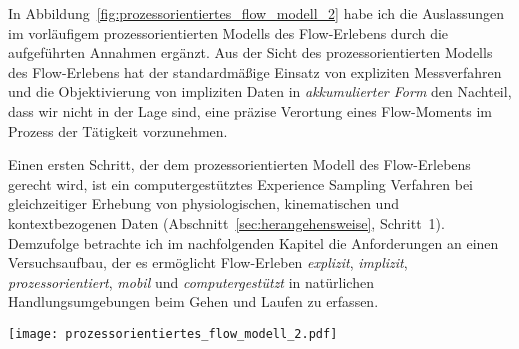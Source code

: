 In Abbildung~\ref{fig:prozessorientiertes_flow_modell_2} habe ich die Auslassungen im vorläufigem prozessorientierten Modells des Flow-Erlebens durch die aufgeführten Annahmen ergänzt. Aus der Sicht des prozessorientierten Modells des Flow-Erlebens hat der standardmäßige Einsatz von expliziten Messverfahren und die Objektivierung von impliziten Daten in \emph{akkumulierter Form} den Nachteil, dass wir nicht in der Lage sind, eine präzise Verortung eines Flow-Moments im Prozess der Tätigkeit vorzunehmen. 

Einen ersten Schritt, der dem prozessorientierten Modell des Flow-Erlebens gerecht wird, ist ein computergestütztes Experience Sampling Verfahren bei gleichzeitiger Erhebung von physiologischen, kinematischen und kontextbezogenen Daten (Abschnitt~\ref{sec:herangehensweise}, Schritt~1). Demzufolge betrachte ich im nachfolgenden Kapitel die Anforderungen an einen Versuchsaufbau, der es ermöglicht Flow-Erleben \emph{explizit}, \emph{implizit}, \emph{prozessorientiert}, \emph{mobil} und \emph{computergestützt} in natürlichen Handlungsumgebungen beim Gehen und Laufen zu erfassen.
\begin{sidewaysfigure}
	\texttt{[image: prozessorientiertes\_flow\_modell\_2.pdf]} \caption[Prozessorientiertes Modell des Flow-Erlebens (Erweiterung)]{Prozessorientiertes Modell mit Annahmen zu implizit messbaren Auswirkungen des Flow-Erlebens} \label{fig:prozessorientiertes_flow_modell_2} 
\end{sidewaysfigure}

